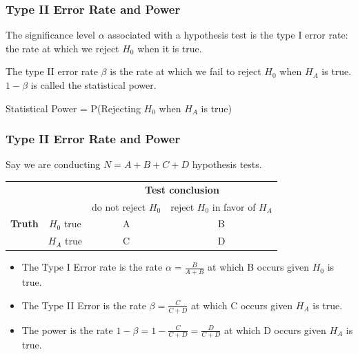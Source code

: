 \documentclass[handout]{beamer}
\newcommand{\blue}[1]{\textcolor{blue2}{#1}}
\begin{document}
\begin{frame}
\frametitle{Type II Error Rate and Power}
The significance level $\alpha$ associated with a hypothesis test is the \blue{type I error rate}:  the rate at which we reject $H_0$ when it is true.  

\pause\vspace{0.5cm}

The \blue{type II error rate $\beta$} is the rate at which we fail to reject $H_0$ when $H_A$ is true.  $1-\beta$ is called the \blue{statistical power}.

\pause\vspace{0.5cm}

\blue{Statistical Power} = P(Rejecting $H_0$ when $H_A$ is true)

\end{frame}



\begin{frame}
\frametitle{Type II Error Rate and Power}
Say we are conducting $N=A+B+C+D$ hypothesis tests.
\begin{center}
  \begin{tabular}{cc|cc}
     \multicolumn{2}{c}{}  & \multicolumn{2}{c}{\textbf{Test conclusion}} \\ 
     &  & do not reject $H_0$ & reject $H_0$ in favor of $H_A$ \\ 
\hline
    \textbf{Truth} & $H_0$ true & A & B \\ 
     & $H_A$ true & C & D \\ 
    \hline
  \end{tabular}
\end{center}

\vspace{0.25cm}

\begin{itemize}
\pause \item The \blue{Type I Error rate} is the rate $\alpha = \frac{B}{A+B}$ at which B occurs \blue{given $H_0$ is true}.
\pause \item The \blue{Type II Error} is the rate $\beta = \frac{C}{C+D}$ at which 
C occurs \blue{given $H_A$ is true}.
\pause \item The \blue{power} is the rate $1-\beta = 1-\frac{C}{C+D} = \frac{D}{C+D}$ at which D occurs \blue{given $H_A$ is true}.
\end{itemize}

\end{frame}
\end{document}
